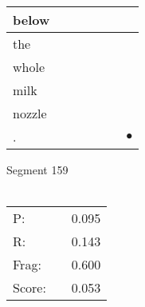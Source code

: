 \documentclass[landscape]{article}
\newcommand{\ssp}{\hspace{2pt}}
\newcommand{\mex}{\cellcolor{g}$\bullet$}
\begin{document}
\begin{tabular}{|l|p{10pt}|p{10pt}|p{10pt}|p{10pt}|p{10pt}|p{10pt}|}
\hline
\ssp below \ssp&\hspace{2pt}&\hspace{2pt}&\hspace{2pt}&\hspace{2pt}&\hspace{2pt}&\hspace{2pt}\\
\hline
\ssp the \ssp&\hspace{2pt}&\hspace{2pt}&\hspace{2pt}&\hspace{2pt}&\hspace{2pt}&\hspace{2pt}\\
\hline
\ssp whole \ssp&\hspace{2pt}&\hspace{2pt}&\hspace{2pt}&\hspace{2pt}&\hspace{2pt}&\hspace{2pt}\\
\hline
\ssp milk \ssp&\hspace{2pt}&\hspace{2pt}&\hspace{2pt}&\hspace{2pt}&\hspace{2pt}&\hspace{2pt}\\
\hline
\ssp nozzle \ssp&\hspace{2pt}&\hspace{2pt}&\hspace{2pt}&\hspace{2pt}&\hspace{2pt}&\hspace{2pt}\\
\hline
\ssp \cellcolor{ref5}. \ssp&\hspace{2pt}&\hspace{2pt}&\hspace{2pt}&\hspace{2pt}&\hspace{2pt}&\hspace{2pt}\mex\\
\hline
\end{tabular}

\vspace{6pt}
\noindent Segment 159\\\\
\noindent\begin{tabular}{lm{12pt}r}
\hline
P:&&0.095\\
R:&&0.143\\
Frag:&&0.600\\
Score:&&0.053\\
\end{tabular}
\end{document}
